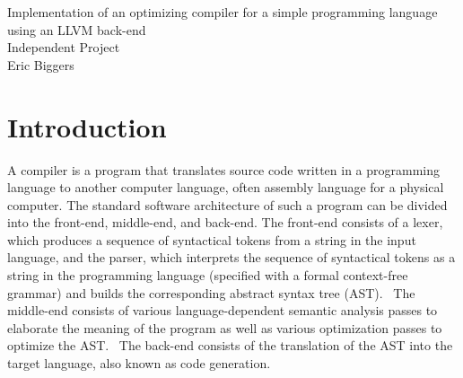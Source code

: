 \documentclass[11pt]{article}
\begin{document}
\begin{center}
{\LARGE Implementation of an optimizing compiler for a simple programming
language using an LLVM back-end} \\
\vspace{8mm}
{\Large Independent Project} \\
\vspace{4mm}
{\large Eric Biggers}
\end{center}
\vspace{5mm}

\begin{abstract}
    Designing a retargetable optimizing compiler is a very difficult task.
    Modern optimizing compilers such as GCC are extremely complex pieces of
    software that support hundreds of different optimizations and many different
    target architectures.  In contrast to the GCC project, the LLVM project
    attempts to encapsulate its compiler infrastructure in libraries that can be
    reused by external programs.  Here I present a compiler for a toy
    programming language called ``garter'' which takes advantage of the LLVM
    infrastructure to implement an optimizing compiler which performs
    state-of-the-art optimizations on the generated code.  I also present an
    interpreter for garter that uses LLVM to perform just-in-time (JIT)
    compilation.  In addition to showing the usefulness of LLVM, this project
    serves as a demonstration of the construction of a compiler front-end.
\end{abstract}

\tableofcontents

\section{Introduction}

A compiler is a program that translates source code written in a
programming language to another computer language, often assembly language for a
physical computer.  The standard software architecture of such a program can be
divided into the front-end, middle-end, and back-end.  The front-end consists of
a lexer, which produces a sequence of syntactical tokens from a string in the
input language, and the parser, which interprets the sequence of syntactical
tokens as a string in the programming language (specified with a formal
context-free grammar) and builds the corresponding abstract syntax tree (AST). \
The middle-end consists of various language-dependent semantic analysis passes
to elaborate the meaning of the program as well as various optimization passes
to optimize the AST. \ The back-end consists of the translation of the AST into
the target language, also known as code generation.
\end{document}
